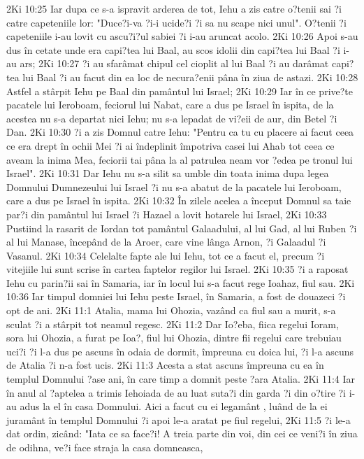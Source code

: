 2Ki 10:25  Iar dupa ce s-a ispravit arderea de tot, Iehu a zis catre o?tenii sai ?i catre capeteniile lor: "Duce?i-va ?i-i ucide?i ?i sa nu scape nici unul". O?tenii ?i capeteniile i-au lovit cu ascu?i?ul sabiei ?i i-au aruncat acolo.
2Ki 10:26  Apoi s-au dus în cetate unde era capi?tea lui Baal, au scos idolii din capi?tea lui Baal ?i i-au ars;
2Ki 10:27  ?i au sfarâmat chipul cel cioplit al lui Baal ?i au darâmat capi?tea lui Baal ?i au facut din ea loc de necura?enii pâna în ziua de astazi.
2Ki 10:28  Astfel a stârpit Iehu pe Baal din pamântul lui Israel;
2Ki 10:29  Iar în ce prive?te pacatele lui Ieroboam, feciorul lui Nabat, care a dus pe Israel în ispita, de la acestea nu s-a departat nici Iehu; nu s-a lepadat de vi?eii de aur, din Betel ?i Dan.
2Ki 10:30  ?i a zis Domnul catre Iehu: "Pentru ca tu cu placere ai facut ceea ce era drept în ochii Mei ?i ai îndeplinit împotriva casei lui Ahab tot ceea ce aveam la inima Mea, feciorii tai pâna la al patrulea neam vor ?edea pe tronul lui Israel".
2Ki 10:31  Dar Iehu nu s-a silit sa umble din toata inima dupa legea Domnului Dumnezeului lui Israel ?i nu s-a abatut de la pacatele lui Ieroboam, care a dus pe Israel în ispita.
2Ki 10:32  În zilele acelea a început Domnul sa taie par?i din pamântul lui Israel ?i Hazael a lovit hotarele lui Israel,
2Ki 10:33  Pustiind la rasarit de Iordan tot pamântul Galaadului, al lui Gad, al lui Ruben ?i al lui Manase, începând de la Aroer, care vine lânga Arnon, ?i Galaadul ?i Vasanul.
2Ki 10:34  Celelalte fapte ale lui Iehu, tot ce a facut el, precum ?i vitejiile lui sunt scrise în cartea faptelor regilor lui Israel.
2Ki 10:35  ?i a raposat Iehu cu parin?ii sai în Samaria, iar în locul lui s-a facut rege Ioahaz, fiul sau.
2Ki 10:36  Iar timpul domniei lui Iehu peste Israel, în Samaria, a fost de douazeci ?i opt de ani.
2Ki 11:1  Atalia, mama lui Ohozia, vazând ca fiul sau a murit, s-a sculat ?i a stârpit tot neamul regesc.
2Ki 11:2  Dar Io?eba, fiica regelui Ioram, sora lui Ohozia, a furat pe Ioa?, fiul lui Ohozia, dintre fii regelui care trebuiau uci?i ?i l-a dus pe ascuns în odaia de dormit, împreuna cu doica lui, ?i l-a ascuns de Atalia ?i n-a fost ucis.
2Ki 11:3  Acesta a stat ascuns împreuna cu ea în templul Domnului ?ase ani, în care timp a domnit peste ?ara Atalia.
2Ki 11:4  Iar în anul al ?aptelea a trimis Iehoiada de au luat suta?i din garda ?i din o?tire ?i i-au adus la el în casa Domnului. Aici a facut cu ei legamânt , luând de la ei juramânt în templul Domnului ?i apoi le-a aratat pe fiul regelui,
2Ki 11:5  ?i le-a dat ordin, zicând: "Iata ce sa face?i! A treia parte din voi, din cei ce veni?i în ziua de odihna, ve?i face straja la casa domneasca,
